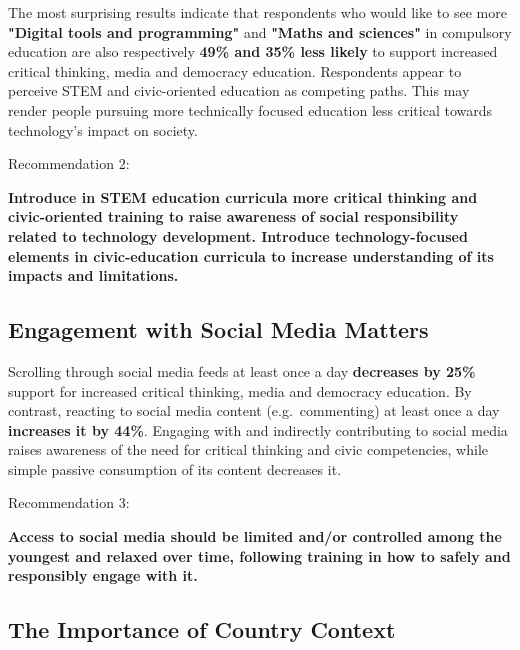 \documentclass[
]{article}
\begin{document}
The most surprising results indicate that respondents who would like to
see more \textbf{"Digital tools and programming"} and
\textbf{"Maths and sciences"} in compulsory education are also
respectively \textbf{49\% and 35\% less likely} to support increased
critical thinking, media and democracy education. Respondents appear to
perceive STEM and civic-oriented education as competing paths. This may
render people pursuing more technically focused education less critical
towards technology's impact on society.

\begin{center}
\begin{tcolorbox}[orangebox]
Recommendation 2:

\textbf{Introduce in STEM education curricula more critical thinking and civic-oriented training to raise awareness of social responsibility related to technology development. Introduce technology-focused elements in civic-education curricula to increase understanding of its impacts and limitations.}
\end{tcolorbox}
\end{center}

\subsection{Engagement with Social Media
Matters}\label{engagement-with-social-media-matters}

Scrolling through social media feeds at least once a day
\textbf{decreases by 25\%} support for increased critical thinking,
media and democracy education. By contrast, reacting to social media
content (e.g.~commenting) at least once a day
\textbf{increases it by 44\%}. Engaging with and indirectly contributing
to social media raises awareness of the need for critical thinking and
civic competencies, while simple passive consumption of its content
decreases it.

\begin{center}
\begin{tcolorbox}[greenbox]
Recommendation 3:

\textbf{Access to social media should be limited and/or controlled among the youngest and relaxed over time, following training in how to safely and responsibly engage with it.}
\end{tcolorbox}
\end{center}

\subsection{The Importance of Country
Context}\label{the-importance-of-country-context}
\end{document}
